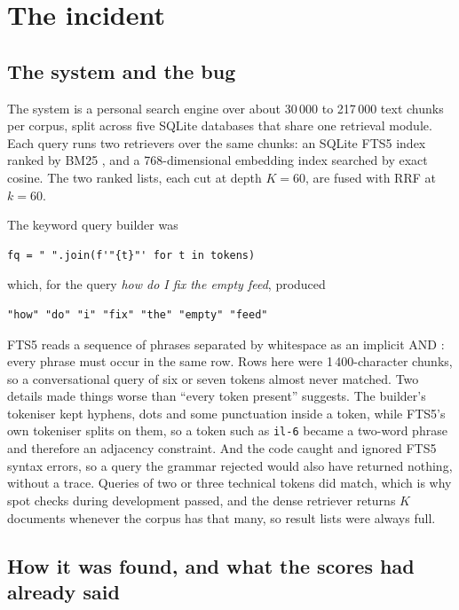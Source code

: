 \documentclass[11pt]{article}
\begin{document}
\section{The incident}
\label{sec:incident}

\subsection{The system and the bug}
\label{sec:bug}

The system is a personal search engine over about 30\,000 to 217\,000 text chunks per corpus, split across five SQLite databases that share one retrieval module. Each query runs two retrievers over the same chunks: an SQLite FTS5 index ranked by BM25 \citep{robertson2009bm25,sqlite_fts5}, and a 768-dimensional embedding index searched by exact cosine. The two ranked lists, each cut at depth $K = 60$, are fused with RRF at $k = 60$.

The keyword query builder was
\begin{verbatim}
fq = " ".join(f'"{t}"' for t in tokens)
\end{verbatim}
which, for the query \emph{how do I fix the empty feed}, produced
\begin{verbatim}
"how" "do" "i" "fix" "the" "empty" "feed"
\end{verbatim}
FTS5 reads a sequence of phrases separated by whitespace as an implicit AND \citep[\S 3]{sqlite_fts5}: every phrase must occur in the same row. Rows here were 1\,400-character chunks, so a conversational query of six or seven tokens almost never matched. Two details made things worse than ``every token present'' suggests. The builder's tokeniser kept hyphens, dots and some punctuation inside a token, while FTS5's own tokeniser splits on them, so a token such as \texttt{il-6} became a two-word phrase and therefore an adjacency constraint. And the code caught and ignored FTS5 syntax errors, so a query the grammar rejected would also have returned nothing, without a trace. Queries of two or three technical tokens did match, which is why spot checks during development passed, and the dense retriever returns $K$ documents whenever the corpus has that many, so result lists were always full.

\subsection{How it was found, and what the scores had already said}
\label{sec:found}
\end{document}
